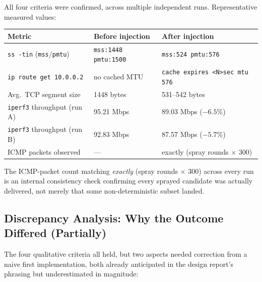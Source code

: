 \documentclass[11pt]{article}
\begin{document}
All four criteria were confirmed, across multiple independent runs.
Representative measured values:

\begin{center}
\begin{longtable}{@{}lll@{}}
\toprule
\textbf{Metric} & \textbf{Before injection} & \textbf{After injection} \\
\midrule
\endhead
\texttt{ss -tin} (\texttt{mss}/\texttt{pmtu}) & \texttt{mss:1448 pmtu:1500} & \texttt{mss:524 pmtu:576} \\
\texttt{ip route get 10.0.0.2} & no cached MTU & \texttt{cache expires <N>sec mtu 576} \\
Avg.\ TCP segment size & 1448 bytes & 531--542 bytes \\
\texttt{iperf3} throughput (run A) & 95.21 Mbps & 89.03 Mbps ($-6.5\%$) \\
\texttt{iperf3} throughput (run B) & 92.83 Mbps & 87.57 Mbps ($-5.7\%$) \\
ICMP packets observed & --- & exactly (spray rounds $\times$ 300) \\
\bottomrule
\end{longtable}
\end{center}

The ICMP-packet count matching \emph{exactly} (spray rounds $\times$
300) across every run is an internal consistency check confirming every
sprayed candidate was actually delivered, not merely that some
non-deterministic subset landed.

\subsection{Discrepancy Analysis: Why the Outcome Differed (Partially)}

The four qualitative criteria all held, but two aspects needed
correction from a naive first implementation, both already anticipated
in the design report's phrasing but underestimated in magnitude:
\end{document}

